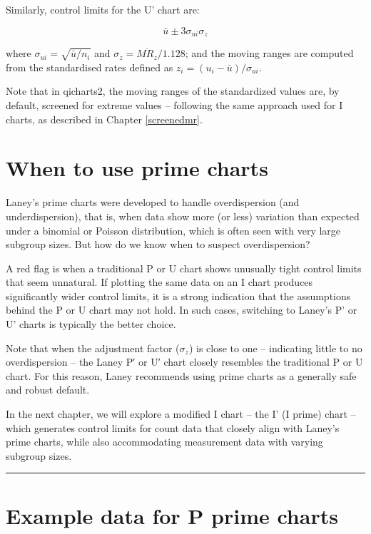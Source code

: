 \documentclass[
]{book}
\begin{document}
Similarly, control limits for the U' chart are:

\[\bar{u}\pm3\sigma_{ui}\sigma_z\]

where \(\sigma_{ui}=\sqrt{\bar{u}/n_i}\) and \(\sigma_{z}=\overline{MR_z}/1.128\); and the moving ranges are computed from the standardised rates defined as \(z_i=(u_i-\bar{u})/\sigma_{ui}\).

Note that in qicharts2, the moving ranges of the standardized values are, by default, screened for extreme values -- following the same approach used for I charts, as described in Chapter \ref{screenedmr}.

\section{When to use prime charts}\label{when-to-use-prime-charts}

Laney's prime charts were developed to handle overdispersion (and underdispersion), that is, when data show more (or less) variation than expected under a binomial or Poisson distribution, which is often seen with very large subgroup sizes. But how do we know when to suspect overdispersion?

A red flag is when a traditional P or U chart shows unusually tight control limits that seem unnatural. If plotting the same data on an I chart produces significantly wider control limits, it is a strong indication that the assumptions behind the P or U chart may not hold. In such cases, switching to Laney's P' or U' charts is typically the better choice.

Note that when the adjustment factor (\(\sigma_z\)) is close to one -- indicating little to no overdispersion -- the Laney P′ or U′ chart closely resembles the traditional P or U chart. For this reason, Laney recommends using prime charts as a generally safe and robust default.

In the next chapter, we will explore a modified I chart -- the I' (I prime) chart -- which generates control limits for count data that closely align with Laney's prime charts, while also accommodating measurement data with varying subgroup sizes.

\begin{center}\rule{0.5\linewidth}{0.5pt}\end{center}

\section*{Example data for P prime charts}\label{pp-data}
\end{document}
